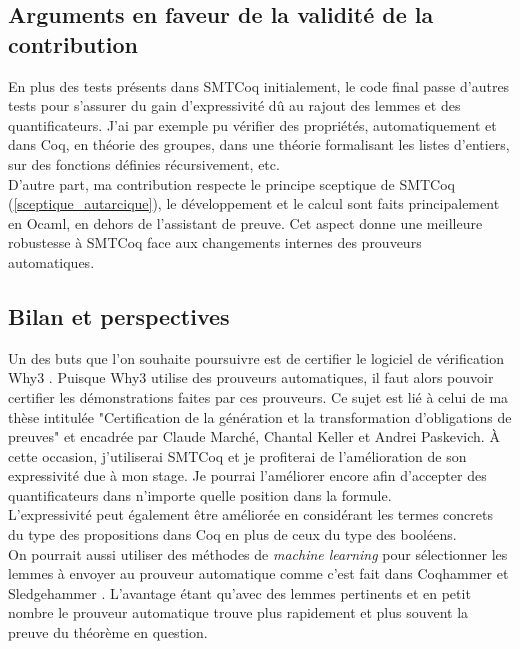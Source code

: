 \documentclass[11pt]{article}
\begin{document}
\subsection{Arguments en faveur de la validité de la contribution}

En plus des tests présents dans SMTCoq initialement, le code final passe d'autres tests pour s'assurer du gain d'expressivité dû au rajout des lemmes et des quantificateurs. J'ai par exemple pu vérifier des propriétés, automatiquement et dans Coq, en théorie des groupes, dans une théorie formalisant les listes d'entiers, sur des fonctions définies récursivement, etc. \\ 
D'autre part, ma contribution respecte le principe sceptique de SMTCoq (\ref{sceptique_autarcique}), le développement et le calcul sont faits principalement en Ocaml, en dehors de l'assistant de preuve. Cet aspect donne une meilleure robustesse à SMTCoq face aux changements internes des prouveurs automatiques.


\subsection{Bilan et perspectives}\label{persp}

Un des buts que l'on souhaite poursuivre est de certifier le logiciel de vérification Why3 \cite{why3_intro}. Puisque Why3 utilise des prouveurs automatiques, il faut alors pouvoir certifier les démonstrations faites par ces prouveurs. Ce sujet est lié à celui de ma thèse intitulée "Certification de la génération et la transformation d'obligations de preuves" et encadrée par Claude Marché, Chantal Keller et Andrei Paskevich. À cette occasion, j'utiliserai SMTCoq et je profiterai de l'amélioration de son expressivité due à mon stage. Je pourrai l'améliorer encore afin d'accepter des quantificateurs dans n'importe quelle position dans la formule.\\
L'expressivité peut également être améliorée en considérant les termes concrets du type des propositions dans Coq en plus de ceux du type des booléens. \\
On pourrait aussi utiliser des méthodes de \textit{machine learning} pour sélectionner les lemmes à envoyer au prouveur automatique comme c'est fait dans Coqhammer et Sledgehammer \cite{hol_selector, coqhammer}. L'avantage étant qu'avec des lemmes pertinents et en petit nombre le prouveur automatique trouve plus rapidement et plus souvent la preuve du théorème en question.\\
\end{document}
